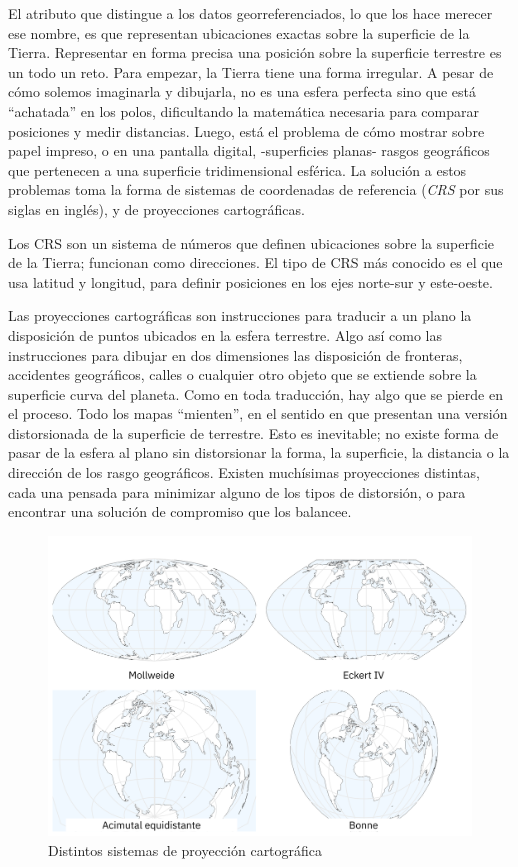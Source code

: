 \documentclass[spanish,]{book}
\begin{document}
El atributo que distingue a los datos georreferenciados, lo que los hace merecer ese nombre, es que representan ubicaciones exactas sobre la superficie de la Tierra. Representar en forma precisa una posición sobre la superficie terrestre es un todo un reto. Para empezar, la Tierra tiene una forma irregular. A pesar de cómo solemos imaginarla y dibujarla, no es una esfera perfecta sino que está ``achatada'' en los polos, dificultando la matemática necesaria para comparar posiciones y medir distancias. Luego, está el problema de cómo mostrar sobre papel impreso, o en una pantalla digital, -superficies planas- rasgos geográficos que pertenecen a una superficie tridimensional esférica. La solución a estos problemas toma la forma de sistemas de coordenadas de referencia (\emph{CRS} por sus siglas en inglés), y de proyecciones cartográficas.

Los CRS son un sistema de números que definen ubicaciones sobre la superficie de la Tierra; funcionan como direcciones. El tipo de CRS más conocido es el que usa latitud y longitud, para definir posiciones en los ejes norte-sur y este-oeste.

Las proyecciones cartográficas son instrucciones para traducir a un plano la disposición de puntos ubicados en la esfera terrestre. Algo así como las instrucciones para dibujar en dos dimensiones las disposición de fronteras, accidentes geográficos, calles o cualquier otro objeto que se extiende sobre la superficie curva del planeta. Como en toda traducción, hay algo que se pierde en el proceso. Todo los mapas ``mienten'', en el sentido en que presentan una versión distorsionada de la superficie de terrestre. Esto es inevitable; no existe forma de pasar de la esfera al plano sin distorsionar la forma, la superficie, la distancia o la dirección de los rasgo geográficos. Existen muchísimas proyecciones distintas, cada una pensada para minimizar alguno de los tipos de distorsión, o para encontrar una solución de compromiso que los balancee.

\begin{figure}
\includegraphics[width=1\linewidth]{imagenes/proyecciones} \caption{Distintos sistemas de proyección cartográfica}\label{fig:unnamed-chunk-145}
\end{figure}
\end{document}
